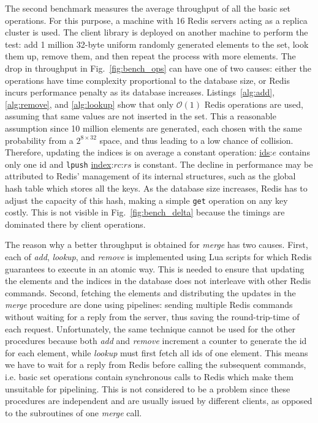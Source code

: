 The second benchmark measures the average throughput of all the basic set
operations. For this purpose, a machine with 16 Redis servers acting as a
replica cluster is used. The client library is deployed on another machine to
perform the test: add 1 million 32-byte uniform randomly generated elements to
the set, look them up, remove them, and then repeat the process with more
elements. The drop in throughput in Fig.~\ref{fig:bench_ops} can have one of
two causes: either the operations have time complexity proportional to the
database size, or Redis incurs performance penalty as its database increases.
Listings~\ref{alg:add}, \ref{alg:remove}, and \ref{alg:lookup} show that
only $\mathcal{O}(1)$ Redis operations are used, assuming that same values are
not inserted in the set. This a reasonable assumption since 10 million elements
are generated, each chosen with the same probability from a $2^{8 \times 32}$
space, and thus leading to a low chance of collision. Therefore, updating the
indices is on average a constant operation: \underline{ids}:$e$ contains only
one id and \texttt{lpush} \underline{index}:$rc$:$rs$ is constant. The decline
in performance may be attributed to Redis' management of its internal
structures, such as the global hash table which stores all the keys. As the
database size increases, Redis has to adjust the capacity of this hash, making a
simple \texttt{get} operation on any key costly. This is not visible in
Fig.~\ref{fig:bench_delta} because the timings are dominated there by client
operations.

The reason why a better throughput is obtained for \textit{merge} has two
causes. First, each of \textit{add}, \textit{lookup}, and \textit{remove} is
implemented using Lua scripts for which Redis guarantees to execute in an
atomic way. This is needed to ensure that updating the elements and the indices
in the database does not interleave with other Redis commands. Second, fetching
the elements and distributing the updates in the \textit{merge} procedure are
done using pipelines: sending multiple Redis commands without waiting for a
reply from the server, thus saving the round-trip-time of each request.
Unfortunately, the same technique cannot be used for the other procedures
because both \textit{add} and \textit{remove} increment a counter to generate
the id for each element, while \textit{lookup} must first fetch all ids of one
element. This means we have to wait for a reply from Redis before calling the
subsequent commands, i.e. basic set operations contain synchronous calls to
Redis which make them unsuitable for pipelining. This is not considered to be a
problem since these procedures are independent and are usually issued by
different clients, as opposed to the subroutines of one \textit{merge} call.